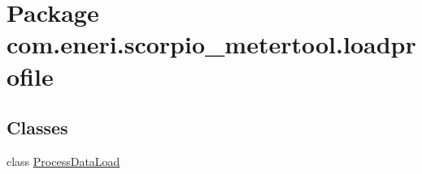 \hypertarget{namespacecom_1_1eneri_1_1scorpio__metertool_1_1loadprofile}{}\section{Package com.\+eneri.\+scorpio\+\_\+metertool.\+loadprofile}
\label{namespacecom_1_1eneri_1_1scorpio__metertool_1_1loadprofile}
\subsection*{Classes}
\begin{DoxyCompactItemize}
\item 
class \hyperlink{classcom_1_1eneri_1_1scorpio__metertool_1_1loadprofile_1_1_process_data_load}{Process\+Data\+Load}
\end{DoxyCompactItemize}
